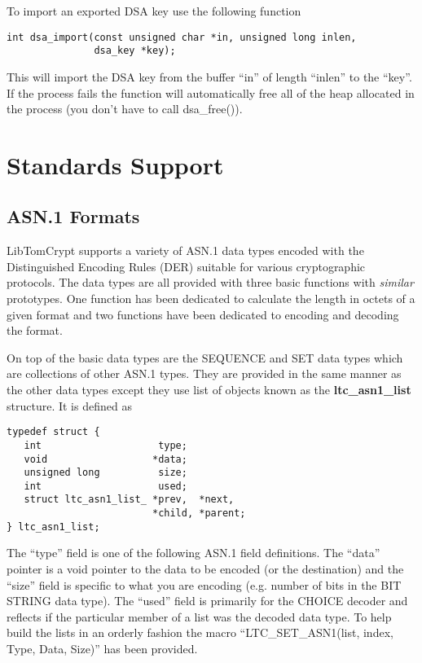 \documentclass[a4paper]{book}
\begin{document}
To import an exported DSA key use the following function

\begin{verbatim}
int dsa_import(const unsigned char *in, unsigned long inlen, 
               dsa_key *key);
\end{verbatim}

This will import the DSA key from the buffer ``in'' of length ``inlen'' to the ``key''.  If the process fails the function
will automatically free all of the heap allocated in the process (you don't have to call dsa\_free()).  

\chapter{Standards Support}
\section{ASN.1 Formats}
LibTomCrypt supports a variety of ASN.1 data types encoded with the Distinguished Encoding Rules (DER) suitable for various cryptographic protocols.  The data types
are all provided with three basic functions with \textit{similar} prototypes.  One function has been dedicated to calculate the length in octets of a given
format and two functions have been dedicated to encoding and decoding the format.  

On top of the basic data types are the SEQUENCE and SET data types which are collections of other ASN.1 types.  They are provided 
in the same manner as the other data types except they use list of objects known as the \textbf{ltc\_asn1\_list} structure.  It is defined as 

\begin{verbatim}
typedef struct {
   int                    type;
   void                  *data;
   unsigned long          size;
   int                    used;
   struct ltc_asn1_list_ *prev,  *next, 
                         *child, *parent;
} ltc_asn1_list;
\end{verbatim}

The ``type'' field is one of the following ASN.1 field definitions.  The ``data'' pointer is a void pointer to the data to be encoded (or the destination) and the 
``size'' field is specific to what you are encoding (e.g. number of bits in the BIT STRING data type).  The ``used'' field is primarily for the CHOICE decoder
and reflects if the particular member of a list was the decoded data type.  To help build the lists in an orderly fashion the macro
``LTC\_SET\_ASN1(list, index, Type, Data, Size)'' has been provided.
\end{document}
